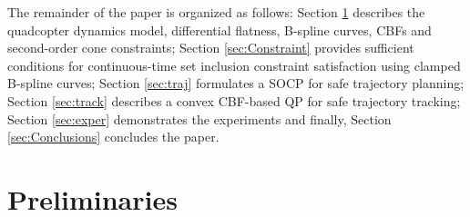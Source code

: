 \documentclass[journal,10pt]{IEEEtran}
\begin{document}
The remainder of the paper is organized as follows: Section \ref{Preliminaries} describes the quadcopter dynamics model,  differential flatness, B-spline curves, CBFs and second-order cone constraints; Section \ref{sec:Constraint} provides sufficient conditions for continuous-time set inclusion constraint satisfaction using clamped B-spline curves; Section \ref{sec:traj} formulates a SOCP for safe trajectory planning; Section \ref{sec:track} describes a convex CBF-based QP for safe trajectory tracking; Section \ref{sec:exper} demonstrates the experiments and finally, Section \ref{sec:Conclusions} concludes the paper.




\section{Preliminaries } \label{Preliminaries}
\end{document}

